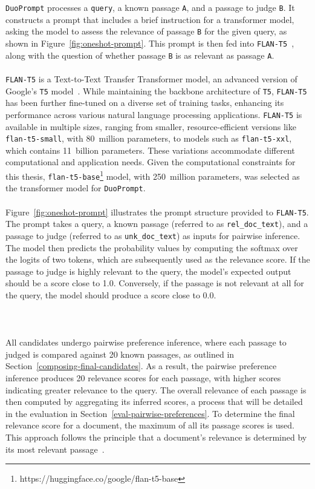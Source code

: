 \\\\
\texttt{DuoPrompt} processes a \texttt{query}, a known passage \texttt{A}, and a passage to judge \texttt{B}. It constructs a prompt that includes a brief instruction for a transformer model, asking the model to assess the relevance of passage \texttt{B} for the given query, as shown in Figure~\ref{fig:oneshot-prompt}. This prompt is then fed into \mbox{\texttt{FLAN-T5}~\citep{chung:2022}}, along with the question of whether passage \texttt{B} is as relevant as passage \texttt{A}.
\\\\
\texttt{FLAN-T5} is a Text-to-Text Transfer Transformer model, an advanced version of Google's \texttt{T5} model~\citep{raffel:2020}. While maintaining the backbone architecture of \texttt{T5}, \texttt{FLAN-T5} has been further fine-tuned on a diverse set of training tasks, enhancing its performance across various natural language processing applications. \texttt{FLAN-T5} is available in multiple sizes, ranging from smaller, resource-efficient versions like \texttt{flan-t5-small}, with 80~million parameters, to models such as \texttt{flan-t5-xxl}, which contains 11~billion parameters. These variations accommodate different computational and application needs. Given the computational constraints for this thesis, \texttt{flan-t5-base}\footnote{https://huggingface.co/google/flan-t5-base} model, with 250~million parameters, was selected as the transformer model for \texttt{DuoPrompt}.
\\\\
Figure~\ref{fig:oneshot-prompt} illustrates the prompt structure provided to \texttt{FLAN-T5}. The prompt takes a query, a known passage (referred to as \texttt{rel\_doc\_text}), and a passage to judge (referred to as \texttt{unk\_doc\_text}) as inputs for pairwise inference. The model then predicts the probability values by computing the softmax over the logits of two tokens, which are subsequently used as the relevance score. If the passage to judge is highly relevant to the query, the model's expected output should be a score close to 1.0. Conversely, if the passage is not relevant at all for the query, the model should produce a score close to 0.0.
\\\\\\\\
All candidates undergo pairwise preference inference, where each passage to judged is compared against 20 known passages, as outlined in Section~\ref{composing-final-candidates}. As a result, the pairwise preference inference produces 20 relevance scores for each passage, with higher scores indicating greater relevance to the query. The overall relevance of each passage is then computed by aggregating its inferred scores, a process that will be detailed in the evaluation in Section~\ref{eval-pairwise-preferences}. To determine the final relevance score for a document, the maximum of all its passage scores is used. This approach follows the principle that a document's relevance is determined by its most relevant passage~\citep{craswell:2019}.
